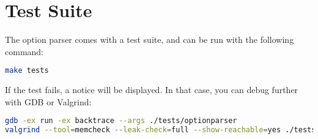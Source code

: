 \documentclass[12pt,a4paper]{article}
\begin{document}
\section{Test Suite}

The option parser comes with a test suite, and can be run with the following command:

\begin{lstlisting}[language=bash]
make tests
\end{lstlisting}

If the test fails, a notice will be displayed. In that case, you can debug further with GDB or Valgrind:

\begin{lstlisting}[language=bash]
gdb -ex run -ex backtrace --args ./tests/optionparser
valgrind --tool=memcheck --leak-check=full --show-reachable=yes ./tests/optionparser
\end{lstlisting}
\end{document}
